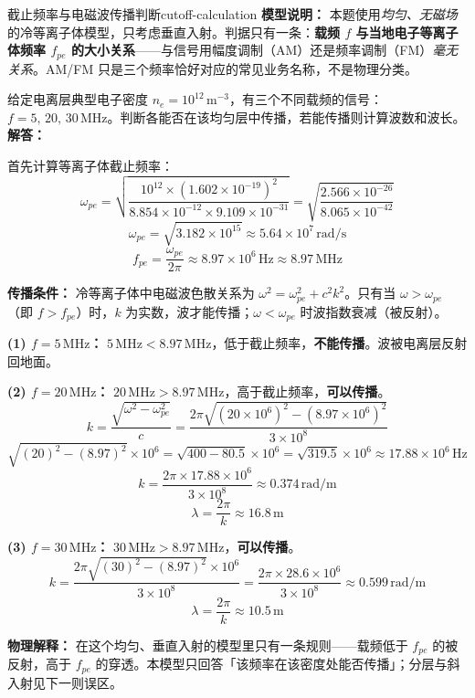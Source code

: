 \begin{example}{截止频率与电磁波传播判断}{cutoff-calculation}
\textbf{模型说明：} 本题使用\emph{均匀、无磁场}的冷等离子体模型，只考虑垂直入射。判据只有一条：\textbf{载频 $f$ 与当地电子等离子体频率 $f_{pe}$ 的大小关系}——与信号用幅度调制（AM）还是频率调制（FM）\emph{毫无关系}。AM/FM 只是三个频率恰好对应的常见业务名称，不是物理分类。

给定电离层典型电子密度 $n_e=10^{12}\,\mathrm{m}^{-3}$，有三个不同载频的信号：$f=5,\,20,\,30\,\mathrm{MHz}$。判断各能否在该均匀层中传播，若能传播则计算波数和波长。
\tcblower
\textbf{解答：}

首先计算等离子体截止频率：
\[
\omega_{pe} = \sqrt{\frac{10^{12}\times (1.602\times 10^{-19})^2}{8.854\times 10^{-12}\times 9.109\times 10^{-31}}} = \sqrt{\frac{2.566\times 10^{-26}}{8.065\times 10^{-42}}}
\]
\[
\omega_{pe} = \sqrt{3.182\times 10^{15}} \approx 5.64\times 10^7\,\mathrm{rad/s}
\]
\[
f_{pe} = \frac{\omega_{pe}}{2\pi} \approx 8.97\times 10^6\,\mathrm{Hz} \approx 8.97\,\mathrm{MHz}
\]

\textbf{传播条件：} 冷等离子体中电磁波色散关系为 $\omega^2 = \omega_{pe}^2 + c^2k^2$。只有当 $\omega > \omega_{pe}$（即 $f > f_{pe}$）时，$k$ 为实数，波才能传播；$\omega < \omega_{pe}$ 时波指数衰减（被反射）。

\textbf{(1) $f=5\,\mathrm{MHz}$：}
$5\,\mathrm{MHz} < 8.97\,\mathrm{MHz}$，低于截止频率，\textbf{不能传播}。波被电离层反射回地面。

\textbf{(2) $f=20\,\mathrm{MHz}$：}
$20\,\mathrm{MHz} > 8.97\,\mathrm{MHz}$，高于截止频率，\textbf{可以传播}。
\[
k = \frac{\sqrt{\omega^2 - \omega_{pe}^2}}{c} = \frac{2\pi\sqrt{(20\times 10^6)^2 - (8.97\times 10^6)^2}}{3\times 10^8}
\]
\[
\sqrt{(20)^2 - (8.97)^2}\times 10^6 = \sqrt{400 - 80.5}\times 10^6 = \sqrt{319.5}\times 10^6 \approx 17.88\times 10^6\,\mathrm{Hz}
\]
\[
k = \frac{2\pi\times 17.88\times 10^6}{3\times 10^8} \approx 0.374\,\mathrm{rad/m}
\]
\[
\lambda = \frac{2\pi}{k} \approx 16.8\,\mathrm{m}
\]

\textbf{(3) $f=30\,\mathrm{MHz}$：}
$30\,\mathrm{MHz} > 8.97\,\mathrm{MHz}$，\textbf{可以传播}。
\[
k = \frac{2\pi\sqrt{(30)^2 - (8.97)^2}\times 10^6}{3\times 10^8} = \frac{2\pi\times 28.6\times 10^6}{3\times 10^8} \approx 0.599\,\mathrm{rad/m}
\]
\[
\lambda = \frac{2\pi}{k} \approx 10.5\,\mathrm{m}
\]

\textbf{物理解释：} 在这个均匀、垂直入射的模型里只有一条规则——载频低于 $f_{pe}$ 的被反射，高于 $f_{pe}$ 的穿透。本模型只回答「该频率在该密度处能否传播」；分层与斜入射见下一则误区。

\end{example}

